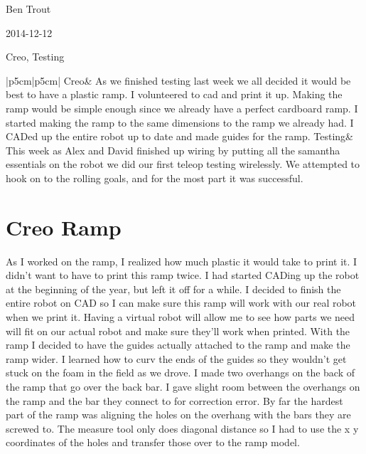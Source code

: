 Ben Trout

2014-12-12

Creo, Testing

\begin{tabular}{|p{5cm}|p{5cm}|}
\hline
Creo&
As we finished testing last week we all decided it would be best to have a plastic ramp. I volunteered to cad and print it up. Making the ramp would be simple enough since we already have a perfect cardboard ramp. I started making the ramp to the same dimensions to the ramp we already had. I CADed up the entire robot up to date and made guides for the ramp. 
\hline
Testing&
This week as Alex and David finished up wiring by putting all the samantha essentials on the robot we did our first teleop testing wirelessly. We attempted to hook on to the rolling goals, and for the most part it was successful.  
\\
\hline
\end{tabular}

\section*{Creo Ramp}
As I worked on the ramp, I realized how much plastic it would take to print it. I didn’t want to have to print this ramp twice. I had started CADing up the robot at the beginning of the year, but left it off for a while. I decided to finish the entire robot on CAD so I can make sure this ramp will work with our real robot when we print it. Having a virtual robot will allow me to see how parts we need will fit on our actual robot and make sure they’ll work when printed. With the ramp I decided to have the guides actually attached to the ramp and make the ramp wider. I learned how to curv the ends of the guides so they wouldn’t get stuck on the foam in the field as we drove. I made two overhangs on the back of the ramp that go over the back bar. I gave slight room between the overhangs on the ramp and the bar they connect to for correction error. By far the hardest part of the ramp was aligning the holes on the overhang with the bars they are screwed to. The measure tool only does diagonal distance so I had to use the x y coordinates of the holes and transfer those over to the ramp model. 


